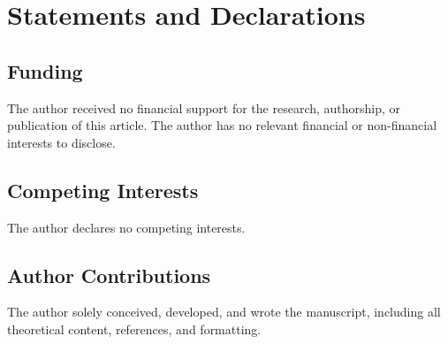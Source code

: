 \documentclass[preprints,article,submit,pdftex,moreauthors]{Definitions/mdpi}
\begin{document}


\section*{Statements and Declarations}
\subsection*{Funding}  
The author received no financial support for the research, authorship, or publication of this article.
The author has no relevant financial or non-financial interests to disclose.

\subsection*{Competing Interests}  
The author declares no competing interests.

\subsection*{Author Contributions}  
The author solely conceived, developed, and wrote the manuscript, including all theoretical content, references, and formatting.
\end{document}
